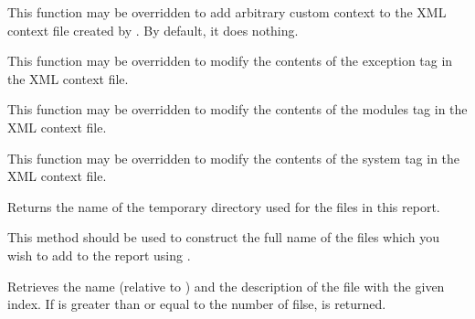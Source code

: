 
This function may be overridden to add arbitrary custom context to the XML
context file created by . By
default, it does nothing.


\label{wxdebugreportdoaddexceptioninfo}


This function may be overridden to modify the contents of the exception tag in
the XML context file.


\label{wxdebugreportdoaddloadedmodules}


This function may be overridden to modify the contents of the modules tag in
the XML context file.


\label{wxdebugreportdoaddsysteminfo}


This function may be overridden to modify the contents of the system tag in
the XML context file.


\label{wxdebugreportgetdirectory}


Returns the name of the temporary directory used for the files in this report.

This method should be used to construct the full name of the files which you
wish to add to the report using .


\label{wxdebugreportgetfile}


Retrieves the name (relative to 
) and the description of the
file with the given index. If  is greater than or equal to the number of
filse, \false is returned.


\label{wxdebugreportgetfilescount}

